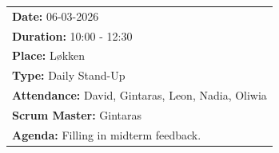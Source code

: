 \begin{table}[H]
    \centering
    \begin{tabular}{|p{15cm}|}   
        \hline
        \textbf{Date:}  06-03-2026 \\
        \textbf{Duration:}  10:00 - 12:30 \\
        \textbf{Place:}  Løkken \\
        \textbf{Type:}  Daily Stand-Up \\
        \textbf{Attendance:}  David, Gintaras, Leon, Nadia, Oliwia \\
        \textbf{Scrum Master:}  Gintaras \\
        \textbf{Agenda:}  Filling in midterm feedback. \\
        \hline
    \end{tabular}
\end{table}

